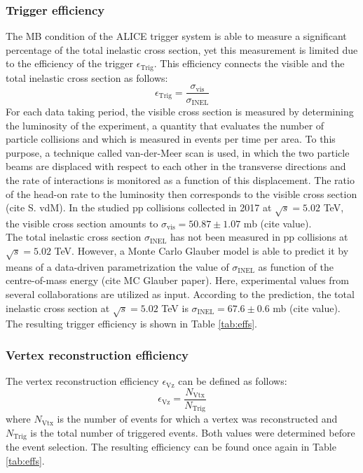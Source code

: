 \documentclass[12pt,a4paper]{report}
\begin{document}
\subsubsection{Trigger efficiency}
The MB condition of the ALICE trigger system is able to measure a significant percentage of the total inelastic cross section, yet this measurement is limited due to the efficiency of the trigger $\epsilon_\text{Trig}$. This efficiency connects the visible and the total inelastic cross section as follows:
\begin{equation}
\epsilon_\text{Trig}  =  \dfrac{\sigma_\text{vis}}{\sigma_\text{INEL}} 
\label{effTrig}
\end{equation}
For each data taking period, the visible cross section is measured by determining the luminosity of the experiment, a quantity that evaluates the number of particle collisions and which is measured in events per time per area. To this purpose, a technique called van-der-Meer scan is used, in which the two particle beams are displaced with respect to each other in the transverse directions and the rate of interactions is monitored as a function of this displacement. The ratio of the head-on rate to the luminosity then corresponds to the visible cross section (cite S. vdM). In the studied pp collisions collected in 2017 at $\sqrt{s} = 5.02$ TeV, the visible cross section amounts to $\sigma_\text{vis} = 50.87 \pm 1.07$ mb (cite value). \\
The total inelastic cross section $\sigma_\text{INEL}$ has not been measured in pp collisions at $\sqrt{s} = 5.02$ TeV. However, a Monte Carlo Glauber model is able to predict it by means of a data-driven parametrization the value of $\sigma_\text{INEL}$ as function of the centre-of-mass energy 	(cite MC Glauber paper). Here, experimental values from several collaborations are utilized as input. According to the prediction, the total inelastic cross section at $\sqrt{s} = 5.02$ TeV is $\sigma_\text{INEL} = 67.6 \pm 0.6$ mb (cite value). The resulting trigger efficiency is shown in Table \ref{tab:effs}.
\subsubsection{Vertex reconstruction efficiency}
The vertex reconstruction efficiency $\epsilon_\text{Vz}$ can be defined as follows:
\begin{equation}
\epsilon_\text{Vz} = \dfrac{N_\text{Vtx}}{N_\text{Trig}} 
\end{equation}
where $N_\text{Vtx}$ is the number of events for which a vertex was reconstructed and $N_\text{Trig}$ is the total number of triggered events. Both values were determined before the event selection. The resulting efficiency can be found once again in Table \ref{tab:effs}.
\end{document}
